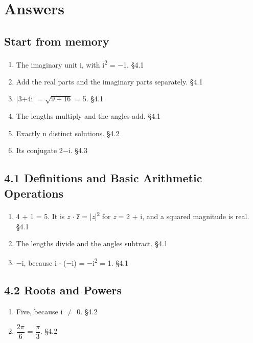 \documentclass[11pt]{article}
\begin{document}
\clearpage
\section{Answers}
\begin{keepsection}\subsection{Start from memory}

\begin{enumerate}
\item The imaginary unit i, with i\textsuperscript{2} = \ensuremath{-}1. \hfill{\small\color{FAUblue}§4.1}
\item Add the real parts and the imaginary parts separately. \hfill{\small\color{FAUblue}§4.1}
\item |3+4i| = \ensuremath{\sqrt{9+16}} = 5. \hfill{\small\color{FAUblue}§4.1}
\item The lengths multiply and the angles add. \hfill{\small\color{FAUblue}§4.1}
\item Exactly n distinct solutions. \hfill{\small\color{FAUblue}§4.2}
\item Its conjugate 2\ensuremath{-}i. \hfill{\small\color{FAUblue}§4.3}
\end{enumerate}

\end{keepsection}
\begin{keepsection}\subsection{4.1 Definitions and Basic Arithmetic Operations}

\begin{enumerate}
\item 4 + 1 = 5. It is \textit{z} \ensuremath{\cdot} \textit{z̅} = |\textit{z}|\textsuperscript{2} for \textit{z} = 2 + i, and a squared magnitude is real. \hfill{\small\color{FAUblue}§4.1}
\item The lengths divide and the angles subtract. \hfill{\small\color{FAUblue}§4.1}
\item \ensuremath{-}i, because i \ensuremath{\cdot} (\ensuremath{-}i) = \ensuremath{-}i\textsuperscript{2} = 1. \hfill{\small\color{FAUblue}§4.1}
\end{enumerate}

\end{keepsection}
\begin{keepsection}\subsection{4.2 Roots and Powers}

\begin{enumerate}
\item Five, because i \ensuremath{\neq} 0. \hfill{\small\color{FAUblue}§4.2}
\item {\small\ensuremath{\dfrac{2π}{6}}} = {\small\ensuremath{\dfrac{π}{3}}}. \hfill{\small\color{FAUblue}§4.2}
\end{enumerate}

\end{keepsection}
\end{document}
